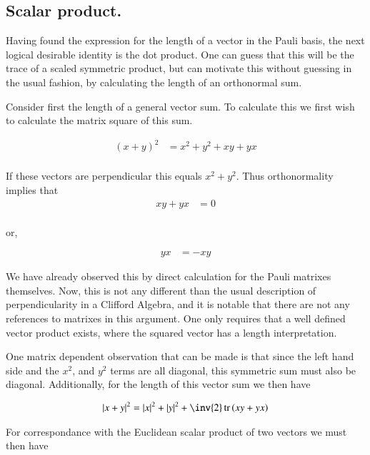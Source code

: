 \documentclass{article}
\DeclareMathOperator{\tr}{tr}
\newcommand{\traceB}[1]{\tr\left({#1}\right)}
\begin{document}
\subsection{ Scalar product. }

Having found the expression for the length of a vector in the Pauli basis, the next logical desirable identity is the dot product.  One can guess that
this will be the trace of a scaled symmetric product, but can motivate this without guessing in the usual fashion, by calculating the length of an 
orthonormal sum.

Consider first the length of a general vector sum.  To calculate this we first wish to calculate the matrix square of this sum.

\begin{align*}
(x + y)^2 &= x^2 + y^2 + x y + y x \\
\end{align*}

If these vectors are perpendicular this equals $x^2 + y^2$.  Thus orthonormality implies that
\begin{align*}
x y + y x &= 0 \\
\end{align*}

or,

\begin{align}
y x &= - x y
\end{align}

We have already observed this by direct calculation for the Pauli matrixes themselves.  Now, this is not any different than the usual description of perpendicularity in a Clifford Algebra, and it is notable that there are not any references to matrixes in this argument.  One only requires that a well defined vector
product exists, where the squared vector has a length interpretation.

One matrix dependent observation that can be made is that since the left hand side and the $x^2$, and $y^2$ terms are all diagonal, this symmetric sum must also be diagonal.  Additionally, for the length of this vector sum we then have

\begin{align*}
{\Abs{x + y}}^2
&= \Abs{x}^2 + \Abs{y}^2 + \inv{2}\traceB{x y + y x} \\
\end{align*}

For correspondance with the Euclidean scalar product of two vectors we must then have
\end{document}
